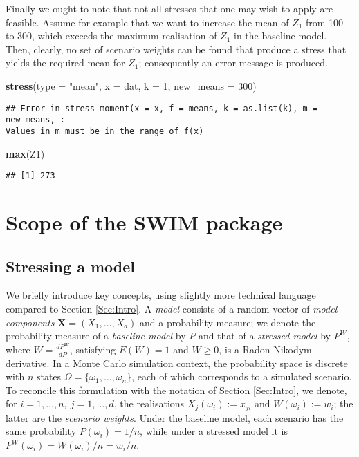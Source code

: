 \documentclass[
]{article}
\newenvironment{Shaded}{\begin{snugshade}}{\end{snugshade}}
\newcommand{\DataTypeTok}[1]{\textcolor[rgb]{0.13,0.29,0.53}{#1}}
\newcommand{\DecValTok}[1]{\textcolor[rgb]{0.00,0.00,0.81}{#1}}
\newcommand{\KeywordTok}[1]{\textcolor[rgb]{0.13,0.29,0.53}{\textbf{#1}}}
\newcommand{\NormalTok}[1]{#1}
\newcommand{\StringTok}[1]{\textcolor[rgb]{0.31,0.60,0.02}{#1}}
\begin{document}
Finally we ought to note that not all stresses that one may wish to apply are feasible. Assume for example that we want to increase the mean of \(Z_1\) from 100 to 300, which exceeds the maximum realisation of \(Z_1\) in the baseline model. Then, clearly, no set of scenario weights can be found that produce a stress that yields the required mean for \(Z_1\); consequently an error message is produced.

\begin{Shaded}
\begin{Highlighting}[]
\KeywordTok{stress}\NormalTok{(}\DataTypeTok{type =} \StringTok{"mean"}\NormalTok{, }\DataTypeTok{x =}\NormalTok{ dat, }\DataTypeTok{k =} \DecValTok{1}\NormalTok{, }\DataTypeTok{new_means =} \DecValTok{300}\NormalTok{)}
\end{Highlighting}
\end{Shaded}

\begin{verbatim}
## Error in stress_moment(x = x, f = means, k = as.list(k), m = new_means, :
Values in m must be in the range of f(x)
\end{verbatim}

\begin{Shaded}
\begin{Highlighting}[]
\KeywordTok{max}\NormalTok{(Z1)}
\end{Highlighting}
\end{Shaded}

\begin{verbatim}
## [1] 273
\end{verbatim}

\hypertarget{Sec:Scope}{%
\section{\texorpdfstring{Scope of the \textbf{SWIM} package}{Scope of the SWIM package}}\label{Sec:Scope}}

\hypertarget{Rfunctions}{%
\subsection{Stressing a model}\label{Rfunctions}}

We briefly introduce key concepts, using slightly more technical language compared to Section \ref{Sec:Intro}. A \emph{model} consists of a random vector of \emph{model components} \(\mathbf X = (X_1,\dots,X_d)\) and a probability measure; we denote the probability measure of a \emph{baseline model} by \(P\) and that of a \emph{stressed model} by \(P^W\), where \(W= \frac{dP^W}{dP}\), satisfying \(E(W)=1\) and \(W\geq 0\), is a Radon-Nikodym derivative. In a Monte Carlo simulation context, the probability space is discrete with \(n\) states \(\Omega=\{\omega_1,\dots,\omega_n\}\), each of which corresponds to a simulated scenario. To reconcile this formulation with the notation of Section \ref{Sec:Intro}, we denote, for \(i=1, \dots, n,~j=1,\dots, d\), the realisations \(X_j(\omega_i):= x_{ji}\) and \(W(\omega_i):=w_i\); the latter are the \emph{scenario weights}. Under the baseline model, each scenario has the same probability \(P(\omega_i)=1/n\), while under a stressed model it is \(P^W(\omega_i)=W(\omega_i)/n=w_i/n\).
\end{document}

